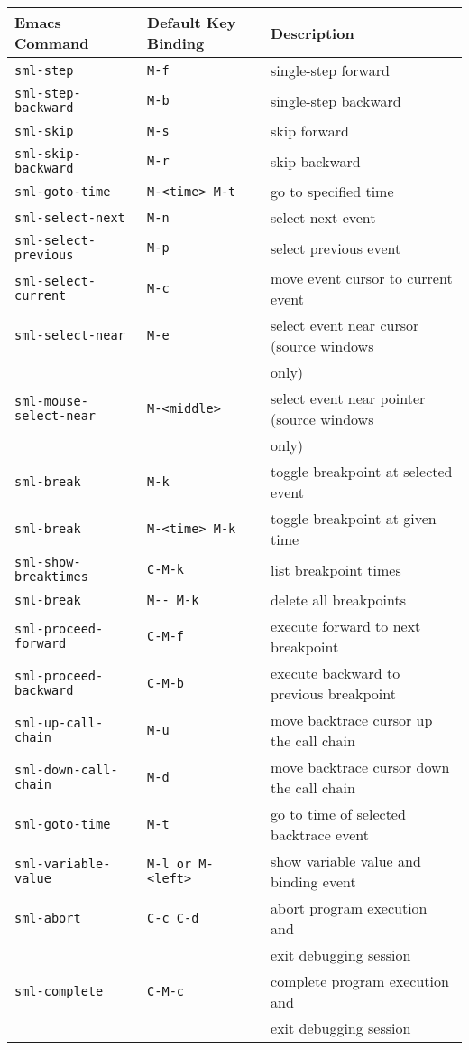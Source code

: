 \begin{center}
\begin{tabular}{|lll|}    \hline
Emacs Command & Default Key Binding & Description \\ \hline
\verb'sml-step' & \verb'M-f'             & single-step forward\\
\verb'sml-step-backward' & \verb'M-b'           & single-step backward \\
\verb'sml-skip' & \verb'M-s'      & skip forward\\
\verb'sml-skip-backward' & \verb'M-r'  & skip backward\\
\verb'sml-goto-time' & \verb'M-<time> M-t'    & go to specified time \\
\verb'sml-select-next' & \verb'M-n'             & select next event \\
\verb'sml-select-previous' & \verb'M-p'             & select previous event \\
\verb'sml-select-current' & \verb'M-c'  & move event cursor to current event \\
\verb'sml-select-near' & \verb'M-e' &
	select event near cursor (source windows \\
    & & only) \\
\verb'sml-mouse-select-near' & \verb'M-<middle>' &
	select event near pointer (source windows \\
    & & only) \\
\verb'sml-break' & \verb'M-k' & toggle breakpoint at selected event \\
\verb'sml-break' & \verb'M-<time> M-k' & toggle breakpoint at given time \\
\verb'sml-show-breaktimes' & \verb'C-M-k'           & list breakpoint times \\
\verb'sml-break' & \verb'M-- M-k'         & delete all breakpoints \\
\verb'sml-proceed-forward' & \verb'C-M-f' 
	& execute forward to next breakpoint \\
\verb'sml-proceed-backward' & \verb'C-M-b' &
	execute backward to previous breakpoint \\
\verb'sml-up-call-chain' & \verb'M-u' &
	move backtrace cursor up the call chain \\
\verb'sml-down-call-chain' & \verb'M-d' &
	move backtrace cursor down the call chain \\
\verb'sml-goto-time' & \verb'M-t' & go to time of selected backtrace event \\
\verb'sml-variable-value' & \verb'M-l or M-<left>' &
	show variable value and binding event \\
\verb'sml-abort' & \verb'C-c C-d' &
	abort program execution and \\
    & & exit debugging session \\
\verb'sml-complete' & \verb'C-M-c' & 
	complete program execution and \\
    & & exit debugging session \\
\hline
\end{tabular}
\end{center}

